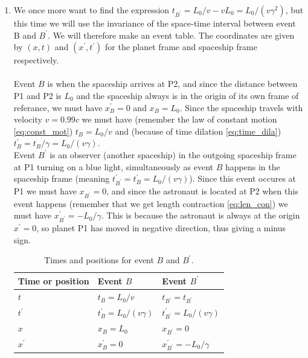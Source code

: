 \documentclass[a4paper,10pt,english]{article}
\begin{document}
\begin{enumerate}
\begin{enumerate}

\item We once more want to find the expression $t_{B^{\prime}}=L_{0}/v-vL_{0}=L_{0}/(v\gamma^{2})$, but this time we will use the invariance of the space-time interval between event B and $B^{\prime}$. We will therefore make an event table. The coordinates are given by $(x,t)$ and $(x^{\prime},t^{\prime})$ for the planet frame and spaceship frame respectively.\\
\\
Event $B$ is when the spaceship arrives at P2, and since the distance between P1 and P2 is $L_{0}$ and the spaceship always is in the origin of its own frame of referance, we must have $x_{B}^{\prime}=0$ and $x_{B}=L_{0}$. Since the spaceship travels with velocity $v=0.99c$ we must have (remember the law of constant motion \ref{eq:const_mot}) $t_{B}=L_{0}/v$ and (because of time dilation \ref{eq:time_dila}) $t_{B}^{\prime}=t_{B}/\gamma=L_{0}/(v\gamma)$.\\

Event $B^{\prime}$ is an observer (another spaceship) in the outgoing spaceship frame at P1 turning on a blue light, simultaneously as event $B$ happens in the spaceship frame (meaning $t^{\prime}_{B^{\prime}}=t^{\prime}_{B}=L_{0}/(v\gamma)$). Since this event occures at P1 we must have $x_{B^{\prime}}=0$, and since the astronaut is located at P2 when this event happens (remember that we get length contraction \ref{eq:len_con}) we must have $x^{\prime}_{B^{\prime}}=-L_{0}/\gamma$. This is because the astronaut is always at the origin $x^{\prime}=0$, so planet P1 has moved in negative direction, thus giving a minus sign.

\begin{table}[H]
  \begin{center}
    \begin{tabular}{| l | l | l |}
   	\hline
	 Time or position & Event $B$ & Event $B^{\prime}$\\ \hline
	 $t$ & $t_{B}=L_{0}/v$ & $t_{B^{\prime}}=t_{B^{\prime}}$\\ \hline
	 $t^{\prime}$ & $t_{B}^{\prime}=L_{0}/(v\gamma)$ & $t^{\prime}_{B^{\prime}}=L_{0}/(v\gamma)$\\ \hline
	 $x$ & $x_{B}=L_{0}$ & $x_{B^{\prime}}=0$\\ \hline
	 $x^{\prime}$ & $x_{B}^{\prime}=0$ & $x^{\prime}_{B^{\prime}}=-L_{0}/\gamma$\\ \hline
	\end{tabular}
    \caption{Times and positions for event $B$ and $B^{\prime}$.}
    \label{tabel:ex_2A_8_2}
  \end{center}
\end{table}
\FloatBarrier


\end{enumerate}
\end{enumerate}
\end{document}
